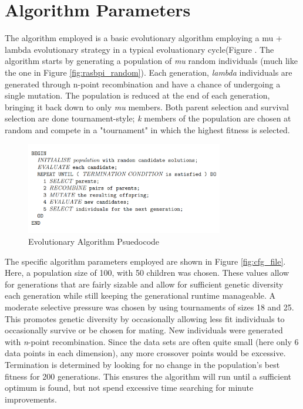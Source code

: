\documentclass[conference]{IEEEtran}
\begin{document}
\section{Algorithm Parameters}
The algorithm employed is a basic evolutionary algorithm employing a mu + lambda evolutionary strategy in a typical evoluationary cycle(Figure . The algorithm starts by generating a population of \textit{mu} random individuals (much like the one in Figure \ref{fig:rasbpi_random}). Each generation, \textit{lambda} individuals are generated through n-point recombination and have a chance of undergoing a single mutation. The population is reduced at the end of each generation, bringing it back down to only \textit{mu} members. Both parent selection and survival selection are done tournament-style; \textit{k} members of the population are chosen at random and compete in a "tournament" in which the highest fitness is selected.

\begin{figure}[ht]
\centering
\includegraphics[width=3.4in]{ea_psuedocode.png}
\caption{Evolutionary Algorithm Psuedocode \cite{cs5401_textbook}}
\label{fig:ea_psuedocode}
\end{figure}

The specific algorithm parameters employed are shown in Figure \ref{fig:cfg_file}. Here, a population size of 100, with 50 children was chosen. These values allow for generations that are fairly sizable and allow for sufficient genetic diversity each generation while still keeping the generational runtime manageable. A moderate selective pressure was chosen by using tournaments of sizes 18 and 25. This promotes genetic diversity by occasionally allowing less fit individuals to occasionally survive or be chosen for mating. New individuals were generated with \textit{n}-point recombination. Since the data sets are often quite small (here only 6 data points in each dimension), any more crossover points would be excessive. Termination is determined by looking for no change in the population's best fitness for 200 generations. This ensures the algorithm will run until a sufficient optimum is found, but not spend excessive time searching for minute improvements.
\end{document}
